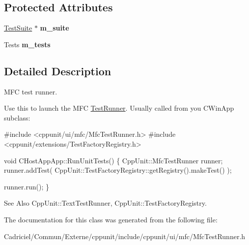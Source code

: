 \subsection*{Protected Attributes}
\begin{DoxyCompactItemize}
\item 
\hypertarget{class_mfc_test_runner_a7700f0b285e70f42f3e84b56be890658}{\hyperlink{class_test_suite}{Test\-Suite} $\ast$ {\bfseries m\-\_\-suite}}\label{class_mfc_test_runner_a7700f0b285e70f42f3e84b56be890658}

\item 
\hypertarget{class_mfc_test_runner_a041d453efb2f9e262676f1d68f1c22af}{Tests {\bfseries m\-\_\-tests}}\label{class_mfc_test_runner_a041d453efb2f9e262676f1d68f1c22af}

\end{DoxyCompactItemize}


\subsection{Detailed Description}
M\-F\-C test runner.

Use this to launch the M\-F\-C \hyperlink{class_test_runner}{Test\-Runner}. Usually called from you C\-Win\-App subclass\-: 


\begin{DoxyCode}
\textcolor{preprocessor}{#include <cppunit/ui/mfc/MfcTestRunner.h>}
\textcolor{preprocessor}{#include <cppunit/extensions/TestFactoryRegistry.h>}

\textcolor{keywordtype}{void} 
CHostAppApp::RunUnitTests()
\{
  CppUnit::MfcTestRunner runner;
  runner.addTest( CppUnit::TestFactoryRegistry::getRegistry().makeTest() );

  runner.run();    
\}
\end{DoxyCode}
 \begin{DoxySeeAlso}{See Also}
Cpp\-Unit\-::\-Text\-Test\-Runner, Cpp\-Unit\-::\-Test\-Factory\-Registry. 
\end{DoxySeeAlso}


The documentation for this class was generated from the following file\-:\begin{DoxyCompactItemize}
\item 
Cadriciel/\-Commun/\-Externe/cppunit/include/cppunit/ui/mfc/Mfc\-Test\-Runner.\-h\end{DoxyCompactItemize}
